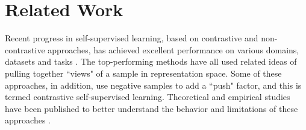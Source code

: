 \section{Related Work}
\vspace{-5pt}
\label{secc:related}
Recent progress in self-supervised learning, based on contrastive and non-contrastive approaches, has achieved excellent performance on various domains, datasets and tasks \cite{he2019momentum,chen2020improved,chen2020simple,Oord2018RepresentationLW,tian2019contrastive,gidaris2020learning,misra2019selfsupervised,NEURIPS2020_4c2e5eaa,8578491,grill2020bootstrap,Gidaris2018UnsupervisedRL,Larsson2017ColorizationAA,Noroozi_2018_CVPR,Pathak2016ContextEF}. The top-performing methods have all used related ideas of pulling together ``views" of a sample in representation space. Some of these approaches, in addition, use negative samples to add a ``push" factor, and this is termed contrastive self-supervised learning. Theoretical and empirical studies have been published to better understand the behavior and limitations of these approaches  \cite{arora2019theoretical,xiao2021contrastive,purushwalkam2020demystifying,tosh2021contrastive,wang2020understanding,yang2020xlnet, NEURIPS2020_63c3ddcc,liu2021selfsupervised,kalantidis2020hard, Newell_2020,cai2020negatives, Ge2022HyperbolicCL, Mishra2020LearningVR}. 

